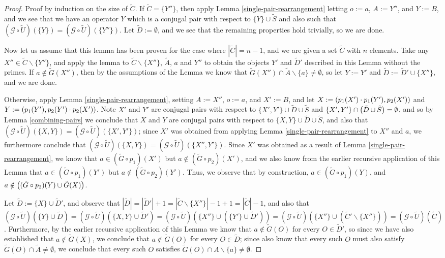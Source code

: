 \documentclass[twocolumn,showpacs,preprintnumbers,amsmath,amssymb,nofootinbib,pra,floatfix]{revtex4-1}
\newcommand{\set}{\tilde}
\newcommand{\genfun}{\mathcal{G}}
\begin{document}
\begin{proof}
Proof by induction on the size of $\set C$.  If $\set C=\{Y''\}$, then apply Lemma \ref{single-pair-rearrangement} letting $o:=a$, $A:=Y''$, and $Y:=B$, and we see that we have an operator $Y$ which is a conjugal pair with respect to $\{Y\}\cup\set S$ and also such that $(\genfun\circ\set U)(\{Y\})=(\genfun\circ\set U)(\{Y''\})$.  Let $\set D:=\emptyset$, and we see that the remaining properties hold trivially, so we are done.

Now let us assume that this lemma has been proven for the case where $|\set C|=n-1$, and we are given a set $\set C$ with $n$ elements.  Take any $X''\in\set C\backslash\{Y''\}$, and apply the lemma to $\set C\backslash \{X''\}$, $\set A$, $a$ and $Y''$ to obtain the objects $Y'$ and $\set D'$ described in this Lemma without the primes.  If $a\notin\set G(X'')$, then by the assumptions of the Lemma we know that $\set G(X'') \cap \set A\backslash \{a\} \ne \emptyset$, so let $Y:=Y'$ and $\set D:=\set D'\cup\{X''\}$, and we are done.

Otherwise, apply Lemma \ref{single-pair-rearrangement}, setting $A:=X''$, $o:=a$, and $X':=B$, and let $X:=\left(p_1(X')\cdot p_1(Y'),p_2(X')\right)$ and $Y:=\left(p_1(Y'),p_2(Y')\cdot p_2(X')\right)$.  Note $X'$ and $Y'$ are conjugal pairs with respect to $\{X',Y'\}\cup\set D\cup\set S$ and $\{X',Y'\}\cap \paren{\set D\cup\set S}=\emptyset$, and so by Lemma \ref{combining-pairs} we conclude that $X$ and $Y$ are conjugal pairs with respect to $\{X,Y\}\cup\set D\cup\set S$, and also that $(\genfun\circ\set U)(\{X,Y\})=(\genfun\circ\set U)(\{X',Y'\})$;  since $X'$ was obtained from applying Lemma \ref{single-pair-rearrangement} to $X''$ and $a$, we furthermore conclude that $(\genfun\circ\set U)(\{X,Y\})=(\genfun\circ\set U)(\{X'',Y'\})$.  Since $X'$ was obtained as a result of Lemma \ref{single-pair-rearrangement}, we know that $a\in (\set G \circ p_1)(X')$ but $a\notin (\set G \circ p_2)(X')$, and we also know from the earlier recursive application of this Lemma that $a\in (\set G \circ p_1)(Y')$ but $a\notin (\set G \circ p_2)(Y')$.  Thus, we observe that by construction, $a\in (\set G \circ p_1)(Y)$, and $a\notin \paren{(\set G \circ p_2)(Y) \cup \set G(X)}$.

Let $\set D:=\{X\}\cup\set D'$, and observe that $|\set D|=|\set D'|+1=|\set C\backslash \{X''\}|-1+1=|\set C|-1$, and also that $(\genfun\circ\set U)(\{Y\}\cup\set D)=(\genfun\circ\set U)(\{X,Y\}\cup\set D')=(\genfun\circ\set U)(\{X''\}\cup(\{Y'\}\cup\set D'))=(\genfun\circ\set U)(\{X''\}\cup(\set C'\backslash\{X''\}))=(\genfun\circ\set U)(\set C)$.  Furthermore, by the earlier recursive application of this Lemma we know that $a\notin\set G(O)$ for every $O\in \set D'$, so since we have also established that $a\notin \set G(X)$, we conclude that $a\notin\set G(O)$ for every $O\in \set D$;  since also know that every such $O$ must also satisfy $\set G(O)\cap \set A \ne \emptyset$, we conclude that every such $O$ satisfies $\set G(O) \cap A\backslash\{a\}\ne\emptyset$.
\end{proof}
\end{document}
